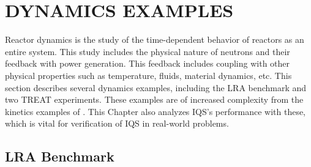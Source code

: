 %
%
%



\chapter{DYNAMICS EXAMPLES \label{sect:dyn}}

Reactor dynamics is the study of the time-dependent behavior of reactors as an entire system. This study includes the physical nature of neutrons and their feedback with power generation.  This feedback includes coupling with other physical properties such as temperature, fluids, material dynamics, etc.  This section describes several dynamics examples, including the LRA benchmark and two TREAT experiments.  These examples are of increased complexity from the kinetics examples of .  This Chapter also analyzes IQS's performance with these, which is vital for verification of IQS in real-world problems.

\section{LRA Benchmark}

